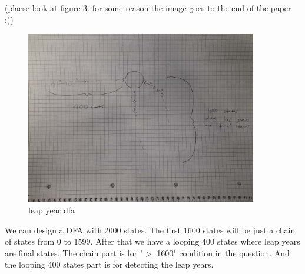 \documentclass{article}
\begin{document}
(plaese look at figure 3. for some reason the image goes to the end of the paper :))
\begin{figure}[h!]
  \centering
  \includegraphics[width=0.9\textwidth]{4.jpeg}
  \caption{leap year dfa}
\end{figure}

We can design a DFA with 2000 states. The first 1600 states will be just a chain of states from 0 to 1599. After that we have a looping 400 states where leap years are final states.
The chain part is for "\(>\) 1600" condition in the question. And the looping 400 states part is for detecting the leap years.
\end{document}
